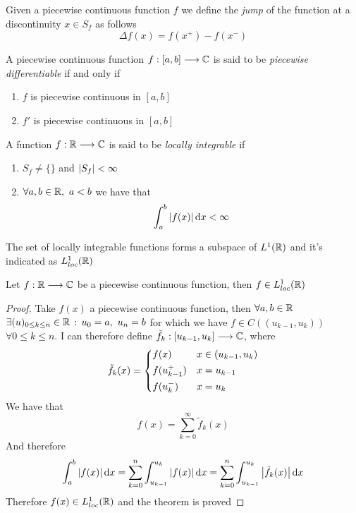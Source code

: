 \documentclass[../complete.tex]{subfiles}
\begin{document}
\begin{dfn}[Jump]
	Given a piecewise continuous function $f$ we define the \textit{jump} of the function at a discontinuity $x\in S_f$ as follows
	\begin{equation*}
		\Delta f(x)=f(x^+)-f(x^-)
	\end{equation*}
\end{dfn}
\begin{dfn}
	A piecewise continuous function $f:[a,b]\overset{}{\longrightarrow}\mathbb{C}$ is said to be \textit{piecewise differentiable} if and only if
	\begin{enumerate}
	\item $f$ is piecewise continuous in $[a,b]$
	\item $f'$ is piecewise continuous in $[a,b]$
	\end{enumerate}
\end{dfn}
\begin{dfn}
	A function $f:\mathbb{R}\overset{}{\longrightarrow}\mathbb{C}$ is said to be \textit{locally integrable} if
	\begin{enumerate}
	\item $S_f\ne\{\}$ and $\abs{S_f}<\infty$
	\item $\forall a,b\in\mathbb{R},\ a<b$ we have that
		\begin{equation*}
			\int_{a}^{b}\abs{f(x)}\operatorname{d\!} x<\infty
		\end{equation*}
	\end{enumerate}
	The set of locally integrable functions forms a subspace of $L^1(\mathbb{R})$ and it's indicated as $L^1_{loc}(\mathbb{R})$
\end{dfn}
\begin{thm}
	Let $f:\mathbb{R}\overset{}{\longrightarrow}\mathbb{C}$ be a piecewise continuous function, then $f\in L^1_{loc}(\mathbb{R})$
\end{thm}
\begin{proof}
	Take $f(x)$ a piecewise continuous function, then $\forall a,b\in\mathbb{R}$ $\exists(u)_{0\le k\le n}\in\mathbb{R}\, :\,  u_0=a,\ u_n=b$ for which we have $f\in C( (u_{k-1},u_k) )$ $\forall 0\le k\le n$. I can therefore define $\tilde{f}_k:[u_{k-1},u_k]\overset{}{\longrightarrow}\mathbb{C}$, where
	\begin{equation*}
		\tilde{f}_k(x)=\begin{dcases}
			f(x)&x\in(u_{k-1},u_k)\\
			f(u_{k-1}^+)&x=u_{k-1}\\
			f(u_k^-)&x=u_k
		\end{dcases}
	\end{equation*}
	We have that
	\begin{equation*}
		f(x)=\sum_{k=0}^\infty\tilde{f}_k(x)
	\end{equation*}
	And therefore
	\begin{equation*}
		\int_{a}^{b}\abs{f(x)}\operatorname{d\!} x=\sum_{k=0}^n\int_{u_{k-1}}^{u_k}\abs{f(x)}\operatorname{d\!} x=\sum_{k=0}^n\int_{u_{k-1}}^{u_k}\abs{\tilde{f}_k(x)}\operatorname{d\!} x
	\end{equation*}
	Therefore $f(x)\in L^1_{loc}(\mathbb{R})$ and the theorem is proved
\end{proof}
\end{document}

